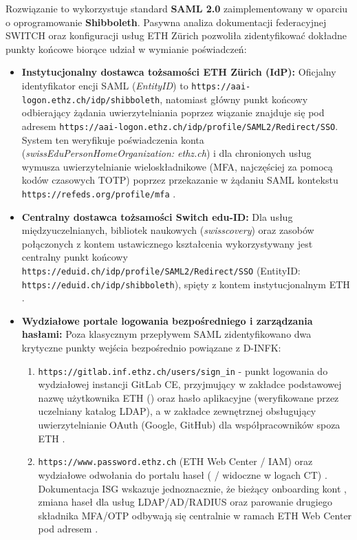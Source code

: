 {{Rozwiązanie to wykorzystuje standard \textbf{SAML 2.0} zaimplementowany w oparciu o oprogramowanie \textbf{Shibboleth}. Pasywna analiza dokumentacji federacyjnej SWITCH oraz konfiguracji usług ETH Zürich pozwoliła zidentyfikować dokładne punkty końcowe biorące udział w wymianie poświadczeń:
\begin{itemize}
    \item \textbf{Instytucjonalny dostawca tożsamości ETH Zürich (IdP):} Oficjalny identyfikator encji SAML (\textit{EntityID}) to \nolinkurl{https://aai-logon.ethz.ch/idp/shibboleth}, natomiast główny punkt końcowy odbierający żądania uwierzytelniania poprzez wiązanie  znajduje się pod adresem \nolinkurl{https://aai-logon.ethz.ch/idp/profile/SAML2/Redirect/SSO}. System ten weryfikuje poświadczenia konta  (\textit{swissEduPersonHomeOrganization: ethz.ch}) i dla chronionych usług wymusza uwierzytelnianie wieloskładnikowe (MFA, najczęściej za pomocą kodów czasowych TOTP) poprzez przekazanie w żądaniu SAML kontekstu \nolinkurl{https://refeds.org/profile/mfa} \cite{switch_eduid}.
    \item \textbf{Centralny dostawca tożsamości Switch edu-ID:} Dla usług międzyuczelnianych, bibliotek naukowych (\textit{swisscovery}) oraz zasobów połączonych z kontem ustawicznego kształcenia wykorzystywany jest centralny punkt końcowy \nolinkurl{https://eduid.ch/idp/profile/SAML2/Redirect/SSO} (EntityID: \nolinkurl{https://eduid.ch/idp/shibboleth}), spięty z kontem instytucjonalnym ETH \cite{switch_eduid}.
    \item \textbf{Wydziałowe portale logowania bezpośredniego i zarządzania hasłami:} Poza klasycznym przepływem SAML zidentyfikowano dwa krytyczne punkty wejścia bezpośrednio powiązane z D-INFK:
    \begin{enumerate}
        \item \nolinkurl{https://gitlab.inf.ethz.ch/users/sign_in} - punkt logowania do wydziałowej instancji GitLab CE, przyjmujący w zakładce podstawowej nazwę użytkownika ETH () oraz hasło aplikacyjne (weryfikowane przez uczelniany katalog LDAP), a w zakładce zewnętrznej obsługujący uwierzytelnianie OAuth (Google, GitHub) dla współpracowników spoza ETH \cite{gitlab_dinfk}.
        \item \nolinkurl{https://www.password.ethz.ch} (ETH Web Center / IAM) oraz wydziałowe odwołania do portalu haseł ( /  widoczne w logach CT) \cite{eth_password_iam}. Dokumentacja ISG wskazuje jednoznacznie, że bieżący onboarding kont , zmiana haseł dla usług LDAP/AD/RADIUS oraz parowanie drugiego składnika MFA/OTP odbywają się centralnie w ramach ETH Web Center pod adresem .
    \end{enumerate}
\end{itemize}

}}
